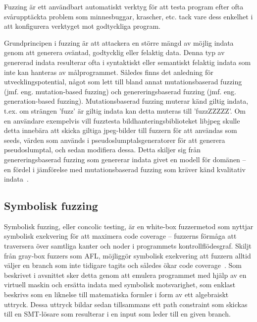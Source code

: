 Fuzzing är ett användbart automatiskt verktyg för att testa program efter ofta
svårupptäckta problem som minnesbuggar, krascher, etc. tack vare dess enkelhet i
att konfigurera verktyget mot godtyckliga program.  

Grundprincipen i fuzzing är att attackera en större mängd av möjlig indata genom
att generera oväntad, godtycklig eller felaktig data. Denna typ av genererad
indata resulterar ofta i syntaktiskt eller semantiskt felaktig indata som inte
kan hanteras av målprogrammet. Således finns det anledning för
utvecklingspotential, något som lett till bland annat mutationsbaserad fuzzing
(jmf. eng. mutation-based fuzzing) och genereringsbaserad fuzzing (jmf. eng.
generation-based fuzzing). Mutationsbaserad fuzzing muterar känd giltig indata,
t.ex. om strängen 'fuzz' är giltig indata kan detta muteras till 'fuzzZZZZZ'. Om
en användare exempelvis vill fuzztesta bildhanteringsbiblioteket libjpeg skulle
detta innebära att skicka giltiga jpeg-bilder till fuzzern för att användas som
seeds, värden som används i pseudoslumptalsgeneratorer för att generera
pseudoslumptal, och sedan modifiera dessa. Detta skiljer sig från
genereringsbaserad fuzzing som genererar indata givet en modell för domänen --
en fördel i jämförelse med mutationsbaserad fuzzing som kräver känd kvalitativ
indata~\cite{fuzzing}. 

\subsection{Symbolisk fuzzing} Symbolisk fuzzing, eller concolic testing, är en
white-box fuzzermetod som nyttjar symbolisk exekvering för att maximera code
coverage -- fuzzerns förmåga att traversera över samtliga kanter och noder i
programmets kontrollflödesgraf. Skiljt från gray-box fuzzers som AFL, möjliggör
symbolisk exekvering att fuzzern alltid väljer en branch som inte tidigare
tagits och således ökar code coverage~\cite{challenges_fuzzing}. Som beskrivet i
avsnittet  sker detta genom att emulera programmet med hjälp av en virtuell
maskin och ersätta indata med symbolisk motsvarighet, som enklast beskrivs som
en liknelse till matematiska formler i form av ett algebraiskt uttryck. Dessa
uttryck bildar sedan tillsammans ett path constraint som skickas till en
SMT-lösare som resulterar i en input som leder till en given branch. 

